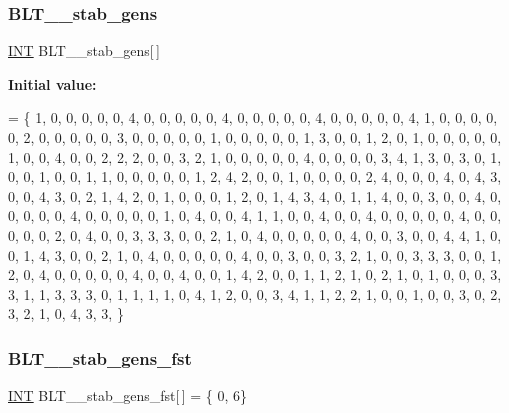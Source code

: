 \subsubsection{\texorpdfstring{B\+L\+T\+\_\+\_\+stab\+\_\+gens}{BLT\_5\_stab\_gens}}
{\footnotesize\ttfamily \mbox{\hyperlink{galois_8h_a09fddde158a3a20bd2dcadb609de11dc}{I\+NT}} B\+L\+T\+\_\+\_\+stab\+\_\+gens\mbox{[}$\,$\mbox{]}}

{\bfseries Initial value\+:}
\begin{DoxyCode}
= \{
1, 0, 0, 0, 0, 0, 4, 0, 0, 0, 0, 0, 4, 0, 0, 0, 0, 0, 4, 0, 0, 0, 0, 0, 4, 
1, 0, 0, 0, 0, 0, 2, 0, 0, 0, 0, 0, 3, 0, 0, 0, 0, 0, 1, 0, 0, 0, 0, 0, 1, 
3, 0, 0, 1, 2, 0, 1, 0, 0, 0, 0, 0, 1, 0, 0, 4, 0, 0, 2, 2, 2, 0, 0, 3, 2, 
1, 0, 0, 0, 0, 0, 4, 0, 0, 0, 0, 3, 4, 1, 3, 0, 3, 0, 1, 0, 0, 1, 0, 0, 1, 
1, 0, 0, 0, 0, 0, 1, 2, 4, 2, 0, 0, 1, 0, 0, 0, 0, 2, 4, 0, 0, 0, 4, 0, 4, 
3, 0, 0, 4, 3, 0, 2, 1, 4, 2, 0, 1, 0, 0, 0, 1, 2, 0, 1, 4, 3, 4, 0, 1, 1, 
4, 0, 0, 3, 0, 0, 4, 0, 0, 0, 0, 0, 4, 0, 0, 0, 0, 0, 1, 0, 4, 0, 0, 4, 1, 
1, 0, 0, 4, 0, 0, 4, 0, 0, 0, 0, 0, 4, 0, 0, 0, 0, 0, 2, 0, 4, 0, 0, 3, 3, 
3, 0, 0, 2, 1, 0, 4, 0, 0, 0, 0, 0, 4, 0, 0, 3, 0, 0, 4, 4, 1, 0, 0, 1, 4, 
3, 0, 0, 2, 1, 0, 4, 0, 0, 0, 0, 0, 4, 0, 0, 3, 0, 0, 3, 2, 1, 0, 0, 3, 3, 
3, 0, 0, 1, 2, 0, 4, 0, 0, 0, 0, 0, 4, 0, 0, 4, 0, 0, 1, 4, 2, 0, 0, 1, 1, 
2, 1, 0, 2, 1, 0, 1, 0, 0, 0, 3, 3, 1, 1, 3, 3, 3, 0, 1, 1, 1, 1, 0, 4, 1, 
2, 0, 0, 3, 4, 1, 1, 2, 2, 1, 0, 0, 1, 0, 0, 3, 0, 2, 3, 2, 1, 0, 4, 3, 3, 
\}
\end{DoxyCode}
\mbox{\label{data___b_l_t_8_c_a20467c77a6d935dc4e58b161b1d3f64e}} 
\subsubsection{\texorpdfstring{B\+L\+T\+\_\+\_\+stab\+\_\+gens\+\_\+fst}{BLT\_5\_stab\_gens\_fst}}
{\footnotesize\ttfamily \mbox{\hyperlink{galois_8h_a09fddde158a3a20bd2dcadb609de11dc}{I\+NT}} B\+L\+T\+\_\+\_\+stab\+\_\+gens\+\_\+fst\mbox{[}$\,$\mbox{]} = \{ 0, 6\}}

\mbox{\label{data___b_l_t_8_c_a4238c7b3917193b66afa4a16489e3395}} 
